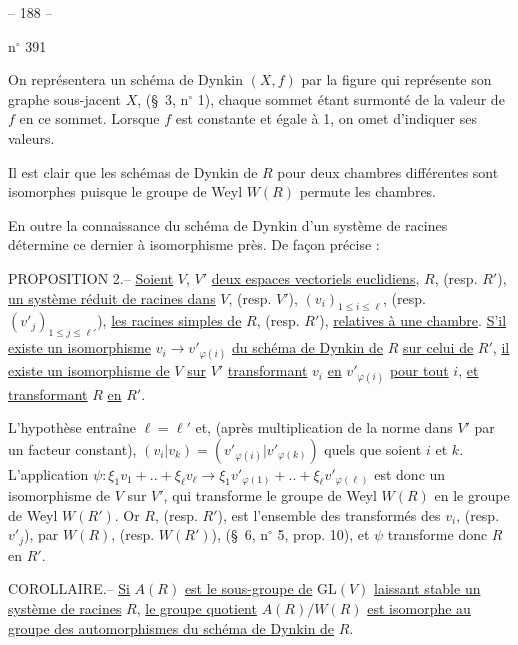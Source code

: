 \begin{center}-- 188 --\end{center}
\hfill n$^\circ$ 391

On représentera un schéma de Dynkin $(X,f)$ par la figure qui représente son
graphe sous-jacent $X$, (\S\ 3, n$^\circ$ 1), chaque sommet étant surmonté
de la valeur de $f$ en ce sommet. Lorsque $f$ est constante et égale à 1,
on omet d'indiquer ses valeurs.

Il est clair que les schémas de Dynkin de $R$ pour deux chambres différentes
sont isomorphes puisque le groupe de Weyl $W(R)$ permute les chambres.

En outre la connaissance du schéma de Dynkin d'un système de racines détermine
ce dernier à isomorphisme près. De façon précise :

PROPOSITION 2.-- \uline{Soient} $V$, $V'$ \uline{deux espaces vectoriels euclidiens},
$R$, (resp. $R'$), \uline{un système réduit de racines dans} $V$,
(resp. $V'$), $(v_i)_{1\leq i\leq\ell}$, (resp. $(v'_j)_{1\leq j\leq\ell'}$),
\uline{les racines simples de} $R$, (resp. $R'$), \uline{relatives à une chambre}.
\uline{S'il existe un isomorphisme} $v_i\longrightarrow v'_{\varphi(i)}$
\uline{du schéma de Dynkin de} $R$ \uline{sur celui de} $R'$,
\uline{il existe un isomorphisme de} $V$ \uline{sur} $V'$
\uline{transformant} $v_i$ \uline{en} $v'_{\varphi(i)}$
\uline{pour tout} $i$, \uline{et transformant} $R$ \uline{en} $R'$.

L'hypothèse entraîne $\ell=\ell'$ et, (après multiplication de la norme dans $V'$
par un facteur constant), $(v_i|v_k)=(v'_{\varphi(i)}|v'_{\varphi(k)})$
quels que soient $i$ et $k$. L'application
$\psi:\xi_1v_1+..+\xi_\ell v_\ell\longrightarrow
\xi_1v'_{\varphi(1)}+..+\xi_\ell v'_{\varphi(\ell)}$
est donc un isomorphisme de $V$ sur $V'$, qui transforme le groupe de Weyl
$W(R)$ en le groupe de Weyl $W(R')$. Or $R$, (resp. $R'$),
est l'ensemble des transformés des $v_i$, (resp. $v'_j$), par $W(R)$,
(resp. $W(R')$), (\S\ 6, n$^\circ$ 5, prop. 10), et $\psi$ transforme donc
$R$ en $R'$.

COROLLAIRE.-- \uline{Si} $A(R)$ \uline{est le sous-groupe de}
$\mathrm{GL}(V)$ \uline{laissant stable un système de racines} $R$,
\uline{le groupe quotient} $A(R)/W(R)$ \uline{est isomorphe au groupe des
automorphismes du schéma de Dynkin de} $R$.
